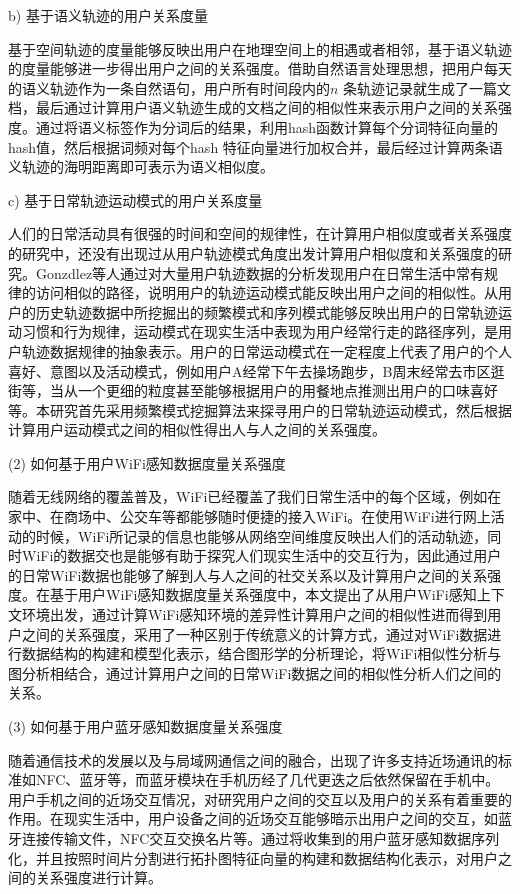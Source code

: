 \par b) 基于语义轨迹的用户关系度量
\par 基于空间轨迹的度量能够反映出用户在地理空间上的相遇或者相邻，基于语义轨迹的度量能够进一步得出用户之间的关系强度。借助自然语言处理思想，把用户每天的语义轨迹作为一条自然语句，用户所有时间段内的$n$ 条轨迹记录就生成了一篇文档，最后通过计算用户语义轨迹生成的文档之间的相似性来表示用户之间的关系强度。通过将语义标签作为分词后的结果，利用hash函数计算每个分词特征向量的hash值，然后根据词频对每个hash 特征向量进行加权合并，最后经过计算两条语义轨迹的海明距离即可表示为语义相似度。%
\par c) 基于日常轨迹运动模式的用户关系度量
\par 人们的日常活动具有很强的时间和空间的规律性，在计算用户相似度或者关系强度的研究中，还没有出现过从用户轨迹模式角度出发计算用户相似度和关系强度的研究。Gonzdlez等人通过对大量用户轨迹数据的分析发现用户在日常生活中常有规律的访问相似的路径，说明用户的轨迹运动模式能反映出用户之间的相似性。从用户的历史轨迹数据中所挖掘出的频繁模式和序列模式能够反映出用户的日常轨迹运动习惯和行为规律，运动模式在现实生活中表现为用户经常行走的路径序列，是用户轨迹数据规律的抽象表示。用户的日常运动模式在一定程度上代表了用户的个人喜好、意图以及活动模式，例如用户A经常下午去操场跑步，B周末经常去市区逛街等，当从一个更细的粒度甚至能够根据用户的用餐地点推测出用户的口味喜好等。本研究首先采用频繁模式挖掘算法来探寻用户的日常轨迹运动模式，然后根据计算用户运动模式之间的相似性得出人与人之间的关系强度。
\par (2) 如何基于用户WiFi感知数据度量关系强度
\par 随着无线网络的覆盖普及，WiFi已经覆盖了我们日常生活中的每个区域，例如在家中、在商场中、公交车等都能够随时便捷的接入WiFi。在使用WiFi进行网上活动的时候，WiFi所记录的信息也能够从网络空间维度反映出人们的活动轨迹，同时WiFi的数据交也是能够有助于探究人们现实生活中的交互行为，因此通过用户的日常WiFi数据也能够了解到人与人之间的社交关系以及计算用户之间的关系强度。在基于用户WiFi感知数据度量关系强度中，本文提出了从用户WiFi感知上下文环境出发，通过计算WiFi感知环境的差异性计算用户之间的相似性进而得到用户之间的关系强度，采用了一种区别于传统意义的计算方式，通过对WiFi数据进行数据结构的构建和模型化表示，结合图形学的分析理论，将WiFi相似性分析与图分析相结合，通过计算用户之间的日常WiFi数据之间的相似性分析人们之间的关系。
\par (3) 如何基于用户蓝牙感知数据度量关系强度
\par 随着通信技术的发展以及与局域网通信之间的融合，出现了许多支持近场通讯的标准如NFC、蓝牙等，而蓝牙模块在手机历经了几代更迭之后依然保留在手机中。用户手机之间的近场交互情况，对研究用户之间的交互以及用户的关系有着重要的作用。在现实生活中，用户设备之间的近场交互能够暗示出用户之间的交互，如蓝牙连接传输文件，NFC交互交换名片等。通过将收集到的用户蓝牙感知数据序列化，并且按照时间片分割进行拓扑图特征向量的构建和数据结构化表示，对用户之间的关系强度进行计算。
